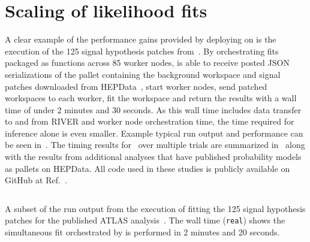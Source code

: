 \section{Scaling of likelihood fits}\label{sec:results}
%
A clear example of the performance gains provided by deploying \pyhf{} on \funcX{} is the execution of the 125 signal hypothesis patches from~\cite{SUSY-2019-08}.
By orchestrating \pyhf{} fits packaged as \funcX{} functions across 85 worker nodes, \funcX{} is able to receive posted JSON serializations of the \pyhf{} pallet containing the background workspace and signal patches downloaded from HEPData~\cite{ATLAS_SUSY_1Lbb_pallet}, start \funcX{} worker nodes, send patched workspaces to each worker, fit the workspace and return the results with a wall time of under 2 minutes and 30 seconds.
As this wall time includes data transfer to and from RIVER and worker node orchestration time, the time required for inference alone is even smaller.
Example typical run output and performance can be seen in~.
The timing results for~\cite{ATLAS_SUSY_1Lbb_pallet} over multiple trials are summarized in~ along with the results from additional analyses that have published probability models as \pyhf{} pallets on HEPData.
All code used in these studies is publicly available on GitHub at Ref.~\cite{study_code}.



\begin{listing}
 \inputminted{text}{src/code/funcX_demo_output.txt}
 \caption{A subset of the run output from the execution of fitting the 125 signal hypothesis patches for the published ATLAS analysis~\cite{SUSY-2019-08}.
 The wall time (\texttt{real}) shows the simultaneous fit orchestrated by \funcX{} is performed in 2 minutes and 20 seconds.}
 \label{lst:funcX_demo_output}
\end{listing}
